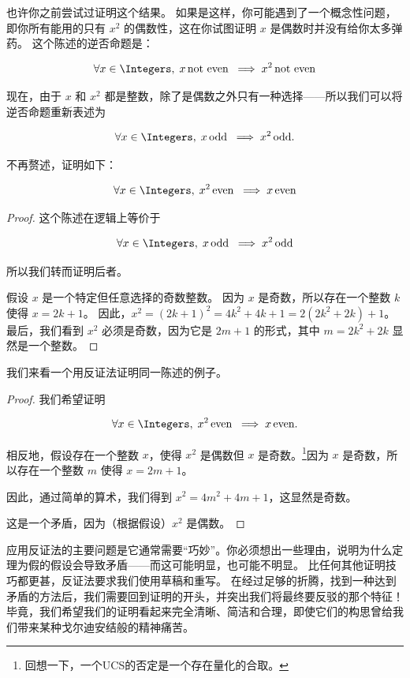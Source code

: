 也许你之前尝试过证明这个结果。
如果是这样，你可能遇到了一个概念性问题，即你所有能用的只有 $x^2$ 的偶数性，这在你试图证明 $x$ 是偶数时并没有给你太多弹药。
这个陈述的逆否命题是：

\[ \forall x \in \Integers, \; x \, \mbox{not even} \; \implies x^2 \, \mbox{not even}
\]

现在，由于 $x$ 和 $x^2$ 都是整数，除了是偶数之外只有一种选择——所以我们可以将逆否命题重新表述为

\[ \forall x \in \Integers, \; x \, \mbox{odd} \; \implies x^2 \, \mbox{odd}.
\]

不再赘述，证明如下：

\begin{thm}
      \[ \forall x \in \Integers, \; x^2 \, \mbox{even} \;
            \implies x \, \mbox{even}
      \]
\end{thm}
\begin{proof}
      这个陈述在逻辑上等价于

      \[ \forall x \in \Integers, \; x \, \mbox{odd} \; \implies x^2 \, \mbox{odd}
      \]

      \noindent 所以我们转而证明后者。

      假设 $x$ 是一个特定但任意选择的奇数整数。
      因为 $x$ 是奇数，所以存在一个整数 $k$ 使得 $x=2k+1$。
      因此，$x^2 = (2k + 1)^2 = 4k^2 + 4k + 1 = 2(2k^2 + 2k) + 1$。
      最后，我们看到 $x^2$ 必须是奇数，因为它是 $2m+1$ 的形式，其中 $m = 2k^2 + 2k$ 显然是一个整数。
\end{proof}

我们来看一个用反证法证明同一陈述的例子。

\begin{proof}

      我们希望证明

      \[ \forall x \in \Integers, \; x^2 \, \mbox{even} \;
            \implies x \, \mbox{even}.
      \]

      相反地，假设存在一个整数 $x$，使得 $x^2$ 是偶数但 $x$ 是奇数。\footnote{回想一下，一个UCS的否定是一个存在量化的合取。}因为 $x$ 是奇数，所以存在一个整数 $m$ 使得 $x=2m+1$。

      因此，通过简单的算术，我们得到 $x^2 = 4m^2+4m+1$，这显然是奇数。

      这是一个矛盾，因为（根据假设）$x^2$ 是偶数。
\end{proof}

应用反证法的主要问题是它通常需要“巧妙”。你必须想出一些理由，说明为什么定理为假的假设会导致矛盾——而这可能明显，也可能不明显。
比任何其他证明技巧都更甚，反证法要求我们使用草稿和重写。
在经过足够的折腾，找到一种达到矛盾的方法后，我们需要回到证明的开头，并突出我们将最终要反驳的那个特征！
毕竟，我们希望我们的证明看起来完全清晰、简洁和合理，即使它们的构思曾给我们带来某种戈尔迪安结般的精神痛苦。

